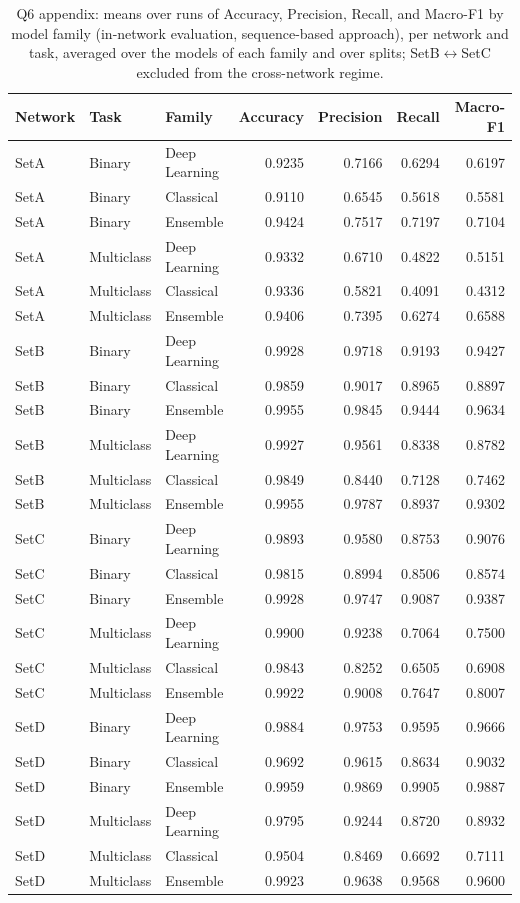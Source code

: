 \begin{table}
\caption{Q6 appendix: means over runs of Accuracy, Precision, Recall, and Macro-F1 by model family (in-network evaluation, sequence-based approach), per network and task, averaged over the models of each family and over splits; SetB$\leftrightarrow$SetC excluded from the cross-network regime.}
\label{tab:q6_appendix_per_network}
\begin{tabular}{lllrrrr}
\toprule
Network & Task & Family & Accuracy & Precision & Recall & Macro-F1 \\
\midrule
SetA & Binary & Deep Learning & 0.9235 & 0.7166 & 0.6294 & 0.6197 \\
SetA & Binary & Classical & 0.9110 & 0.6545 & 0.5618 & 0.5581 \\
SetA & Binary & Ensemble & 0.9424 & 0.7517 & 0.7197 & 0.7104 \\
SetA & Multiclass & Deep Learning & 0.9332 & 0.6710 & 0.4822 & 0.5151 \\
SetA & Multiclass & Classical & 0.9336 & 0.5821 & 0.4091 & 0.4312 \\
SetA & Multiclass & Ensemble & 0.9406 & 0.7395 & 0.6274 & 0.6588 \\
SetB & Binary & Deep Learning & 0.9928 & 0.9718 & 0.9193 & 0.9427 \\
SetB & Binary & Classical & 0.9859 & 0.9017 & 0.8965 & 0.8897 \\
SetB & Binary & Ensemble & 0.9955 & 0.9845 & 0.9444 & 0.9634 \\
SetB & Multiclass & Deep Learning & 0.9927 & 0.9561 & 0.8338 & 0.8782 \\
SetB & Multiclass & Classical & 0.9849 & 0.8440 & 0.7128 & 0.7462 \\
SetB & Multiclass & Ensemble & 0.9955 & 0.9787 & 0.8937 & 0.9302 \\
SetC & Binary & Deep Learning & 0.9893 & 0.9580 & 0.8753 & 0.9076 \\
SetC & Binary & Classical & 0.9815 & 0.8994 & 0.8506 & 0.8574 \\
SetC & Binary & Ensemble & 0.9928 & 0.9747 & 0.9087 & 0.9387 \\
SetC & Multiclass & Deep Learning & 0.9900 & 0.9238 & 0.7064 & 0.7500 \\
SetC & Multiclass & Classical & 0.9843 & 0.8252 & 0.6505 & 0.6908 \\
SetC & Multiclass & Ensemble & 0.9922 & 0.9008 & 0.7647 & 0.8007 \\
SetD & Binary & Deep Learning & 0.9884 & 0.9753 & 0.9595 & 0.9666 \\
SetD & Binary & Classical & 0.9692 & 0.9615 & 0.8634 & 0.9032 \\
SetD & Binary & Ensemble & 0.9959 & 0.9869 & 0.9905 & 0.9887 \\
SetD & Multiclass & Deep Learning & 0.9795 & 0.9244 & 0.8720 & 0.8932 \\
SetD & Multiclass & Classical & 0.9504 & 0.8469 & 0.6692 & 0.7111 \\
SetD & Multiclass & Ensemble & 0.9923 & 0.9638 & 0.9568 & 0.9600 \\
\bottomrule
\end{tabular}
\end{table}
